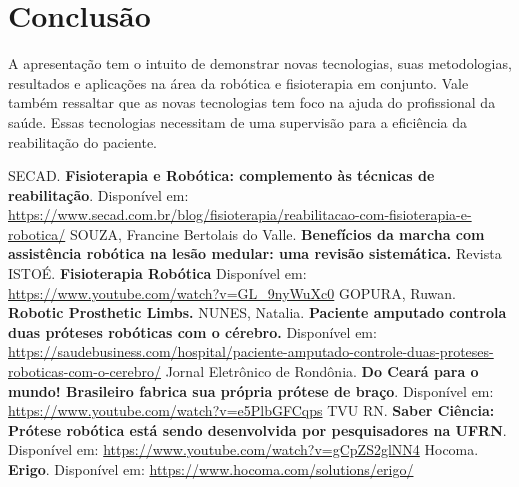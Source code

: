 \documentclass[12pt,a4paper]{article}
\begin{document}
    \section{Conclusão}
    A apresentação tem o intuito de demonstrar novas tecnologias, suas metodologias, resultados e aplicações na área da robótica e fisioterapia em conjunto.
    Vale também ressaltar que as novas tecnologias tem foco na ajuda do profissional da saúde. Essas tecnologias necessitam de uma supervisão para a eficiência da reabilitação do paciente.

    \newpage
    \begin{thebibliography}{BIBLIOGRAFIA}
 
         SECAD. \textbf{Fisioterapia e Robótica: complemento às técnicas de reabilitação}. Disponível em: \url{https://www.secad.com.br/blog/fisioterapia/reabilitacao-com-fisioterapia-e-robotica/}
         SOUZA, Francine Bertolais do Valle. \textbf{Benefícios da marcha com assistência robótica na lesão medular: uma revisão sistemática.}
         Revista ISTOÉ. \textbf{Fisioterapia Robótica} Disponível em: \url{https://www.youtube.com/watch?v=GL_9nyWuXc0}
         GOPURA, Ruwan. \textbf{Robotic Prosthetic Limbs.}
         NUNES, Natalia. \textbf{Paciente amputado controla duas próteses robóticas com o cérebro.} Disponível em: \url{https://saudebusiness.com/hospital/paciente-amputado-controle-duas-proteses-roboticas-com-o-cerebro/}
         Jornal Eletrônico de Rondônia. \textbf{Do Ceará para o mundo! Brasileiro fabrica sua própria prótese de braço}. Disponível em: \url{https://www.youtube.com/watch?v=e5PlbGFCqps}
         TVU RN. \textbf{Saber Ciência: Prótese robótica está sendo desenvolvida por pesquisadores na UFRN}. Disponível em: \url{https://www.youtube.com/watch?v=gCpZS2glNN4}
         Hocoma. \textbf{Erigo}. Disponível em: \url{https://www.hocoma.com/solutions/erigo/}

        
    \end{thebibliography}
\end{document}
